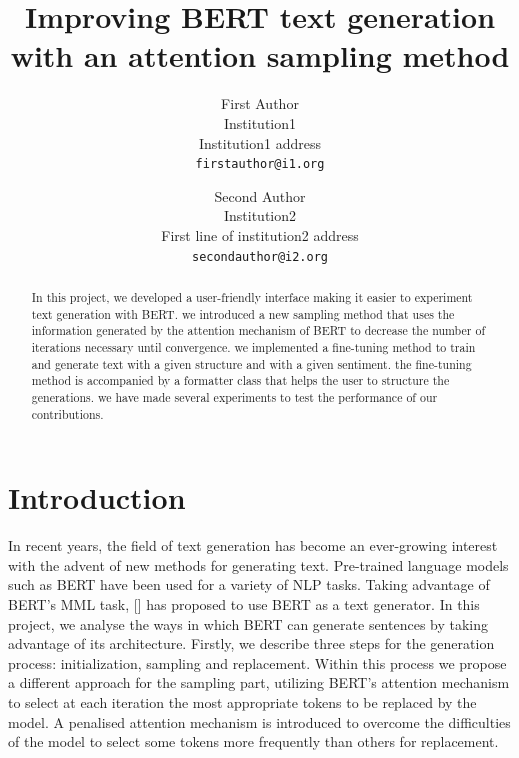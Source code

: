 \documentclass[10pt,twocolumn,letterpaper]{article}
\begin{document}
\title{Improving BERT text generation with an attention sampling method}

\author{First Author\\
Institution1\\
Institution1 address\\
{\tt\small firstauthor@i1.org}
\and
Second Author\\
Institution2\\
First line of institution2 address\\
{\tt\small secondauthor@i2.org}
}

\maketitle

\begin{abstract}
In this project, we developed a user-friendly interface making it easier
to experiment text generation with BERT. we introduced a new sampling method
that uses the information generated by the attention mechanism of BERT to decrease
the number of iterations necessary until convergence. we implemented a fine-tuning
method to train and generate text with a given structure and with a given sentiment.
the fine-tuning method is accompanied by a formatter class that helps the user to
structure the generations. we have made several experiments to test the performance of
our contributions.
\end{abstract}

\section{Introduction}

In recent years, the field of text generation has become an ever-growing interest
with the advent of new methods for generating text. Pre-trained language models
such as BERT have been used for a variety of NLP tasks. Taking advantage of BERT’s
MML task, [] has proposed to use BERT as a text generator. In this project,
we analyse the ways in which BERT can generate sentences by taking advantage of its
architecture. Firstly, we describe three steps for the generation process: initialization,
sampling and replacement. Within this process we propose a different approach for the
sampling part, utilizing BERT’s attention mechanism to select at each iteration the most
appropriate tokens to be replaced by the model. A penalised attention mechanism is
introduced to overcome the difficulties of the model to select some tokens more frequently
than others for replacement.
\end{document}
